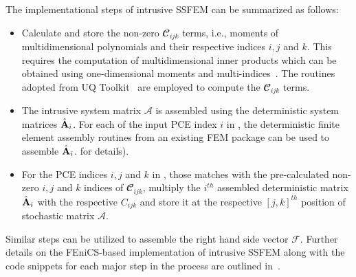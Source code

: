 \documentclass[letter,1p,11pt,oneside,onecolumn,sort&compress]{elsarticle}
\begin{document}
The implementational steps of intrusive SSFEM can be summarized as follows:
\begin{itemize}
\item Calculate and store the non-zero $\mathbfcal{C}_{ijk}$ terms, i.e., moments of multidimensional polynomials and their respective indices $i,j$ and $k$. This requires the computation of multidimensional inner products which can be obtained using one-dimensional moments and multi-indices~\cite{le2010spectral}. %
The routines adopted from UQ Toolkit~\cite{debusschere2013uqtk} are employed to compute the $\mathbfcal{C}_{ijk}$ terms. %
\item The intrusive system matrix $\mathcal{A}$ is assembled using the deterministic system matrices ${\hat{{\mathrm{\bf{A}}}}_i}$.
For each of the input PCE index $i$ in , the deterministic finite element assembly routines from an existing FEM package can be used to assemble ${\hat{{\mathrm{\bf{A}}}}_i}$. %
for details).
\item For the PCE indices $i, j$ and $k$ in , those matches with the pre-calculated non-zero $i, j$ and $k$ indices of $\mathbfcal{C}_{ijk}$, multiply the $i^{th}$ assembled deterministic matrix ${\hat{{\mathrm{\bf{A}}}}_i}$ with the respective $C_{ijk}$ and store it at the respective $[j,k]^{th}$ position of stochastic matrix $\mathcal{A}$.
\end{itemize}
Similar steps can be utilized to assemble the right hand side vector $\mathcal{F}$.
Further details on the FEniCS-based implementation of intrusive SSFEM along with the code snippets for each major step in the process are outlined in~\cite{desai2019scalable}. %
\end{document}
